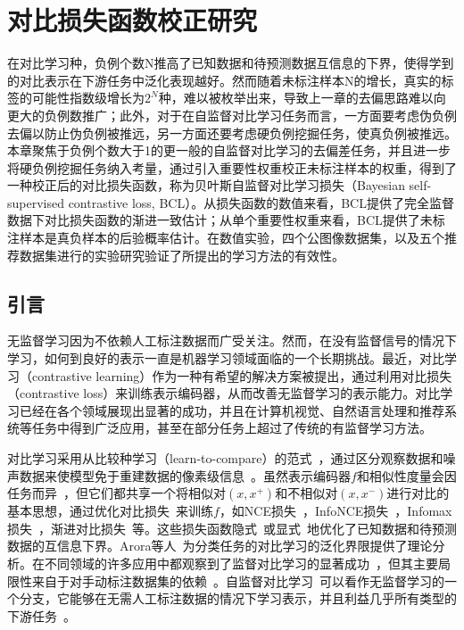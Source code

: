 \chapter{对比损失函数校正研究}
\label{cha:fifthsection}



\label{sec:parameters}
在对比学习种，负例个数N推高了已知数据和待预测数据互信息的下界，使得学到的对比表示在下游任务中泛化表现越好\cite{Oord:2018:arxiv,Chuang:2020:NIPS,Robinson:2021:ICLR}。然而随着未标注样本N的增长，真实的标签的可能性指数级增长为$2^N$种，难以被枚举出来，导致上一章的去偏思路难以向更大的负例数推广；此外，对于在自监督对比学习任务而言，一方面要考虑伪负例去偏以防止伪负例被推远，另一方面还要考虑硬负例挖掘任务，使真负例被推远。本章聚焦于负例个数大于1的更一般的自监督对比学习的去偏差任务，并且进一步将硬负例挖掘任务纳入考量，通过引入重要性权重校正未标注样本的权重，得到了一种校正后的对比损失函数，称为贝叶斯自监督对比学习损失（Bayesian self-supervised contrastive loss, BCL）。从损失函数的数值来看，BCL提供了完全监督数据下对比损失函数的渐进一致估计；从单个重要性权重来看，BCL提供了未标注样本是真负样本的后验概率估计。在数值实验，四个公图像数据集，以及五个推荐数据集进行的实验研究验证了所提出的学习方法的有效性。

\section{引言}
无监督学习因为不依赖人工标注数据而广受关注。然而，在没有监督信号的情况下学习，如何到良好的表示一直是机器学习领域面临的一个长期挑战。最近，对比学习（contrastive learning）作为一种有希望的解决方案被提出，通过利用对比损失（contrastive loss）来训练表示编码器，从而改善无监督学习的表示能力。对比学习已经在各个领域展现出显著的成功，并且在计算机视觉、自然语言处理和推荐系统等任务中得到广泛应用，甚至在部分任务上超过了传统的有监督学习方法。

对比学习采用从比较种学习（learn-to-compare）的范式~\cite{Gutmann:2010:ICAIS}，通过区分观察数据和噪声数据来使模型免于重建数据的像素级信息~\cite{Oord:2018:arxiv}。虽然表示编码器$f$和相似性度量会因任务而异~\cite{Devlin:2018:bert,He:2020:CVPR,Dosovitskiy:2014:NIPS}，但它们都共享一个将相似对$(x, x^+)$和不相似对$(x, x^-)$进行对比的基本思想，通过优化对比损失~\cite{Wang:2020:ICML}来训练$f$，如NCE损失~\cite{Gutmann:2010:ICAIS}，InfoNCE损失~\cite{Oord:2018:arxiv}，Infomax损失~\cite{Hjelm:2018:Arxiv}，渐进对比损失~\cite{Wang:2020:ICML}等。这些损失函数隐式~\cite{Oord:2018:arxiv}或显式~\cite{Hjelm:2018:Arxiv}地优化了已知数据和待预测数据的互信息下界。Arora等人~\cite{Saunshi:2019:ICML}为分类任务的对比学习的泛化界限提供了理论分析。在不同领域的许多应用中都观察到了监督对比学习的显著成功~\cite{Henaff:2020:ICML,Khosla:2020:NIPS}，但其主要局限性来自于对手动标注数据集的依赖~\cite{Liu:2021:TKDE}。自监督对比学习~\cite{Chen:2020:ICML,Chen:2020:NIPS,He:2020:CVPR,Henaff:2020:ICML, Xu:2022:Arxiv}可以看作无监督学习的一个分支，它能够在无需人工标注数据的情况下学习表示，并且利益几乎所有类型的下游任务~\cite{Liu:2021:TKDE,Bachman:2019:NIPS,chen2020improved,Huang:2019:ICML,Wu:2018:CVPR,Zhuang:2019:CVPR}。


